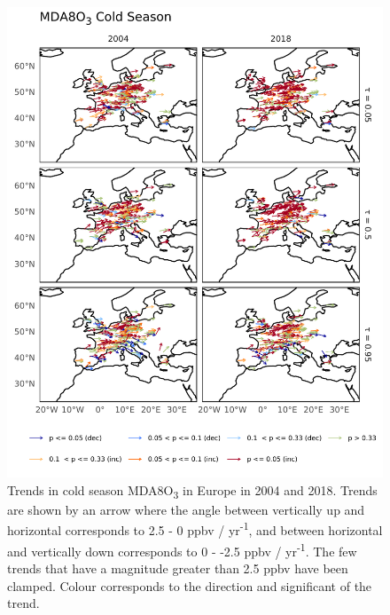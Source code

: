 \documentclass{article}
\begin{document}
\begin{figure}[p]
\centering
\includegraphics[height=0.9\textheight]{figures/si_figures/fS08_o3_map_mda8_cold_eu_o3.pdf}
\caption{Trends in cold season MDA8O\textsubscript{3} in Europe in 2004 and 2018. Trends are shown by an arrow where the angle between vertically up and horizontal corresponds to 2.5 - 0 ppbv / yr\textsuperscript{-1}, and between horizontal and vertically down corresponds to 0 - -2.5 ppbv / yr\textsuperscript{-1}. The few trends that have a magnitude greater than 2.5 ppbv have been clamped. Colour corresponds to the direction and significant of the trend.}
\label{si_fig:o3_map_eu_mda8_cold}
\end{figure}
\clearpage
\end{document}
